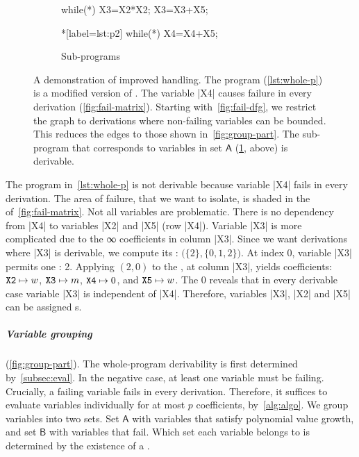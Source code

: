 \begin{figure}
\begin{subfigure}{\textwidth}
{\begin{minipage}{.35\textwidth}
\begin{implisting}
while(*) {
  X3=X2*X2;
  X3=X3+X5; }
\end{implisting}
\end{minipage}%
\hspace{2em}%
\begin{minipage}{.35\textwidth}
\begin{implisting}*[label={lst:p2}]
while(*) {
  X4=X4+X5;
}
\end{implisting}
\end{minipage}
\caption{Sub-programs}\label{lst:sub-progs}
}\end{subfigure}
\caption[A demonstration of improved derivation failure handling]{
A demonstration of improved  handling. The program
(\ref{lst:whole-p}) is a modified version of \exname. The variable \pr|X4|
causes failure in every derivation (\ref{fig:fail-matrix}). Starting
with~\ref{fig:fail-dfg}, we restrict the graph to derivations where non-failing
variables can be bounded. This reduces the edges to those shown
in~\ref{fig:group-part}. The sub-program that corresponds to variables in set
\(\mathsf{A}\) (\ref{lst:sub-progs}, above) is derivable.
}\label{fig:part-prog}
\end{figure}

\begin{example}\label{ex:whl}
The program in~\autoref{lst:whole-p} is not derivable because variable \pr|X4|
fails in every derivation. The area of failure, that
we want to isolate, is shaded in the 
of~\autoref{fig:fail-matrix}. Not all variables are problematic. There is no
dependency from \pr|X4| to variables \pr|X2| and \pr|X5| (row \pr|X4|). Variable
\pr|X3| is more complicated due to the ∞ coefficients in column \pr|X3|. Since we want derivations where \pr|X3| is
derivable, we compute its : \(\big(\{2\},
\{0,1,2\}\big)\). At index 0, variable \pr|X3| permits one : 2. Applying \((2,0)\) to the , at column \pr|X3|,
yields coefficients: \(\text{\pr|X2|} \mapsto w\), \(\text{\pr|X3|} \mapsto m\),
\(\text{\pr|X4|} \mapsto 0\), and \(\text{\pr|X5|} \mapsto w\). The
\(0\) reveals that in every derivable case variable \pr|X3| is
independent of \pr|X4|. Therefore, variables \pr|X3|, \pr|X2| and \pr|X5| can be
assigned s.
\end{example}

\subparagraph*{Variable grouping} (\autoref{fig:group-part}).
The whole-program derivability is first determined by~\autoref{subsec:eval}. In
the negative case, at least one variable must be failing. Crucially, a failing
variable fails in every derivation. Therefore, it suffices to evaluate variables
individually for at most \(p\) coefficients,
by~\autoref{alg:algo}. We group variables into two sets. Set \(\mathsf{A}\) with
variables that satisfy polynomial value growth, and set \(\mathsf{B}\) with
variables that fail. Which set each variable belongs to is determined by the
existence of a .

